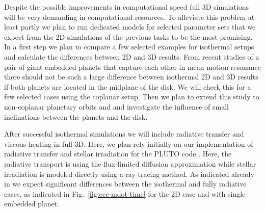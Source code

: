 \documentclass[10pt,fleqn,twoside]{article}
\begin{document}
\begin{description}
Despite the possible improvements in computational speed full 3D simulations will be very
demanding in computational resources. To alleviate this problem at least partly we plan to run
dedicated models for selected parameter sets that we expect from the 2D simulations of the previous
tasks to be the most promising. In a first step we plan to compare a few selected examples for
isothermal setups and calculate the differences between 2D and 3D results.
From recent studies of a pair of giant embedded planets that capture each other
in mean motion resonance there should not be such a large difference between isothermal 2D and 3D results
\citep{2016MNRAS.461.4406A} if both planets are located in the midplane of the disk. 
We will check this for a few selected cases using the coplanar setup.
Then we plan to extend this study to non-coplanar planetary orbits and
and investigate the influence of small inclinations between the planets and the disk.

After successful isothermal simulations we will include radiative transfer and viscous heating in full 3D.
Here, we plan rely initially on our implementation of radiative transfer and stellar irradiation for the
PLUTO code \citep{2013A&A...559A..80K}. Here, the radiative transport is using the flux-limited diffusion
approximation while stellar irradiation is modeled directly using a ray-tracing method.
As indicated already in \citet{2013A&A...560A..40M} we expect significant differences between the 
isothermal and fully radiative cases, as indicated in Fig.~\ref{fig:ecc-mdot-time} for the 2D case and
with single embedded planet.


\end{description}
\end{document}
